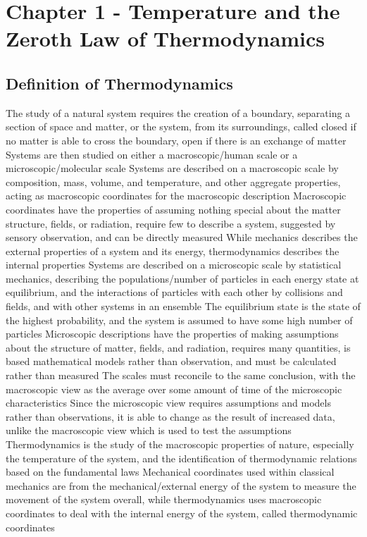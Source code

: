 \section{Chapter 1 - Temperature and the Zeroth Law of Thermodynamics}
\subsection{Definition of Thermodynamics}
\begin{outline*}
\1 The study of a natural system requires the creation of a boundary, separating a section of space and matter, or the system, from its surroundings, called closed if no matter is able to cross the boundary, open if there is an exchange of matter
\1 Systems are then studied on either a macroscopic/human scale or a microscopic/molecular scale
\2 Systems are described on a macroscopic scale by composition, mass, volume, and temperature, and other aggregate properties, acting as macroscopic coordinates for the macroscopic description
\3 Macroscopic coordinates have the properties of assuming nothing special about the matter structure, fields, or radiation, require few to describe a system, suggested by sensory observation, and can be directly measured
\3 While mechanics describes the external properties of a system and its energy, thermodynamics describes the internal properties
\2 Systems are described on a microscopic scale by statistical mechanics, describing the populations/number of particles in each energy state at equilibrium, and the interactions of particles with each other by collisions and fields, and with other systems in an ensemble
\3 The equilibrium state is the state of the highest probability, and the system is assumed to have some high number of particles
\3 Microscopic descriptions have the properties of making assumptions about the structure of matter, fields, and radiation, requires many quantities, is based mathematical models rather than observation, and must be calculated rather than measured
\2 The scales must reconcile to the same conclusion, with the macroscopic view as the average over some amount of time of the microscopic characteristics
\3 Since the microscopic view requires assumptions and models rather than observations, it is able to change as the result of increased data, unlike the macroscopic view which is used to test the assumptions
\1 Thermodynamics is the study of the macroscopic properties of nature, especially the temperature of the system, and the identification of thermodynamic relations based on the fundamental laws
\2 Mechanical coordinates used within classical mechanics are from the mechanical/external energy of the system to measure the movement of the system overall, while thermodynamics uses macroscopic coordinates to deal with the internal energy of the system, called thermodynamic coordinates

\end{outline*}
